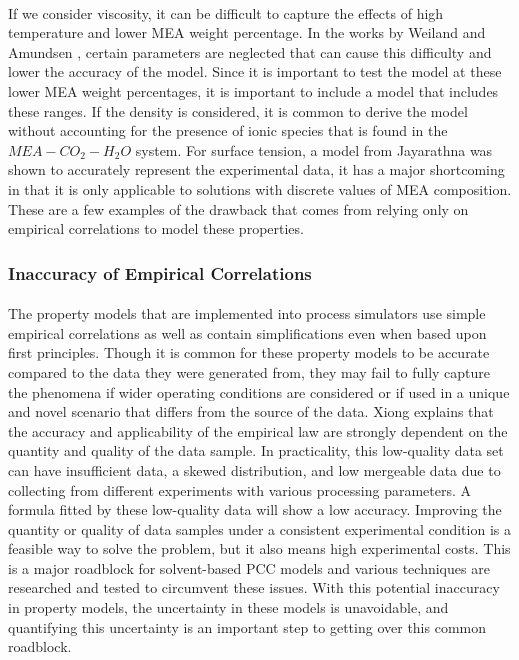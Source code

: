 \documentclass[12pt, letterpaper]{article}
\begin{document}
\paragraph{}
If we consider viscosity, it can be difficult to capture the effects of high temperature and lower MEA weight percentage. In the works by Weiland \cite{Weiland1998} and Amundsen \cite{Amundsen2009}, certain parameters are neglected that can cause this difficulty and lower the accuracy of the model. Since it is important to test the model at these lower MEA weight percentages, it is important to include a model that includes these ranges. If the density is considered, it is common to derive the model without accounting for the presence of ionic species that is found in the $MEA-CO_2-H_2O$ system. For surface tension, a model from Jayarathna \cite{Jayarathna2013} was shown to accurately represent the experimental data, it has a major shortcoming in that it is only applicable to solutions with discrete values of MEA composition.  These are a few examples of the drawback that comes from relying only on empirical correlations to model these properties. 

\subsubsection{Inaccuracy of Empirical Correlations}

\paragraph{}
The property models that are implemented into process simulators use simple empirical correlations as well as contain simplifications even when based upon first principles. Though it is common for these property models to be accurate compared to the data they were generated from, they may fail to fully capture the phenomena if wider operating conditions are considered or if used in a unique and novel scenario that differs from the source of the data. Xiong \cite{Xiong2021} explains that the accuracy and applicability of the empirical law are strongly dependent on the quantity and quality of the data sample.  In practicality, this low-quality data set can have insufficient data, a skewed distribution, and low mergeable data due to collecting from different experiments with various processing parameters. A formula fitted by these low-quality data will show a low accuracy. Improving the quantity or quality of data samples under a consistent experimental condition is a feasible way to solve the problem, but it also means high experimental costs. This is a major roadblock for solvent-based PCC models and various techniques are researched and tested to circumvent these issues.  With this potential inaccuracy in property models, the uncertainty in these models is unavoidable, and quantifying this uncertainty is an important step to getting over this common roadblock.
\end{document}
